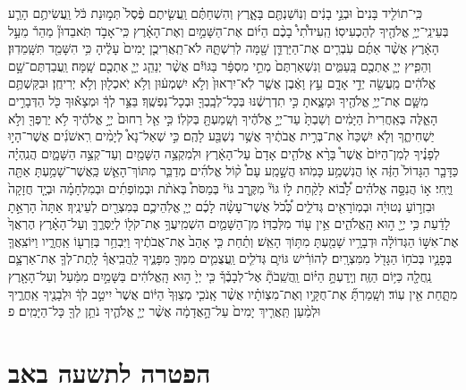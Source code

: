 \documentclass[twoside, openany, parskip=half, 11pt]{book}
\begin{document}
\begin{footnotesize}
\begin{multicols}{2}
כִּֽי־תוֹלִ֤יד בָּנִים֙ וּבְנֵ֣י בָנִ֔ים וְנֽוֹשַׁנְתֶּ֖ם בָּאָ֑רֶץ וְהִשְׁחַתֶּ֗ם וַֽעֲשִׂ֤יתֶם פֶּ֨סֶל֙ תְּמ֣וּנַת כֹּ֔ל וַֽעֲשִׂיתֶ֥ם הָרַ֛ע בְּעֵינֵֽי־יְיָ֥ אֱלֹהֶ֖יךָ לְהַכְעִיסֽוֹ׃ הַֽעִידֹ֩תִי֩ בָכֶ֨ם הַיּ֜וֹם אֶת־הַשָּׁמַ֣יִם וְאֶת־הָאָ֗רֶץ כִּֽי־אָבֹ֣ד תֹּֽאבֵדוּן֘ מַהֵר֒ מֵעַ֣ל הָאָ֔רֶץ אֲשֶׁ֨ר אַתֶּ֜ם עֹֽבְרִ֧ים אֶת־הַיַּרְדֵּ֛ן שָׁ֖מָּה לְרִשְׁתָּ֑הּ לֹא־תַֽאֲרִיכֻ֤ן יָמִים֙ עָלֶ֔יהָ כִּ֥י הִשָּׁמֵ֖ד תִּשָּֽׁמֵדֽוּן׃ וְהֵפִ֧יץ יְיָ֛ אֶתְכֶ֖ם בָּֽעַמִּ֑ים וְנִשְׁאַרְתֶּם֙ מְתֵ֣י מִסְפָּ֔ר בַּגּוֹיִ֕ם אֲשֶׁ֨ר יְנַהֵ֧ג יְיָ֛ אֶתְכֶ֖ם שָֽׁמָּה׃ וַֽעֲבַדְתֶּם־שָׁ֣ם אֱלֹהִ֔ים מַֽעֲשֵׂ֖ה יְדֵ֣י אָדָ֑ם עֵ֣ץ וָאֶ֔בֶן אֲשֶׁ֤ר לֹֽא־יִרְאוּן֙ וְלֹ֣א יִשְׁמְע֔וּן וְלֹ֥א יֹֽאכְל֖וּן וְלֹ֥א יְרִיחֻֽן׃ וּבִקַּשְׁתֶּ֥ם מִשָּׁ֛ם אֶת־יְיָ֥ אֱלֹהֶ֖יךָ וּמָצָ֑אתָ כִּ֣י תִדְרְשֶׁ֔נּוּ בְּכָל־לְבָֽבְךָ֖ וּבְכָל־נַפְשֶֽׁךָ׃ 
בַּצַּ֣ר לְךָ֔ וּמְצָא֕וּךָ כֹּ֖ל הַדְּבָרִ֣ים הָאֵ֑לֶּה בְּאַֽחֲרִית֙ הַיָּמִ֔ים וְשַׁבְתָּ֙ עַד־יְיָ֣ אֱלֹהֶ֔יךָ וְשָֽׁמַעְתָּ֖ בְּקֹלֽוֹ׃ כִּ֣י אֵ֤ל רַחוּם֙ יְיָ֣ אֱלֹהֶ֔יךָ לֹ֥א יַרְפְּךָ֖ וְלֹ֣א יַשְׁחִיתֶ֑ךָ וְלֹ֤א יִשְׁכַּח֙ אֶת־בְּרִ֣ית אֲבֹתֶ֔יךָ אֲשֶׁ֥ר נִשְׁבַּ֖ע לָהֶֽם׃ כִּ֣י שְׁאַל־נָא֩ לְיָמִ֨ים רִֽאשֹׁנִ֜ים אֲשֶׁר־הָי֣וּ לְפָנֶ֗יךָ לְמִן־הַיּוֹם֙ אֲשֶׁר֩ בָּרָ֨א אֱלֹהִ֤ים אָדָם֙ עַל־הָאָ֔רֶץ וּלְמִקְצֵ֥ה הַשָּׁמַ֖יִם וְעַד־קְצֵ֣ה הַשָּׁמָ֑יִם הֲנִֽהְיָ֗ה כַּדָּבָ֤ר הַגָּדוֹל֙ הַזֶּ֔ה א֖וֹ הֲנִשְׁמַ֥ע כָּמֹֽהוּ׃ הֲשָׁ֣מַֽע עָם֩ ק֨וֹל אֱלֹהִ֜ים מְדַבֵּ֧ר מִתּוֹךְ־הָאֵ֛שׁ כַּֽאֲשֶׁר־שָׁמַ֥עְתָּ אַתָּ֖ה וַיֶּֽחִי׃ א֣וֹ הֲנִסָּ֣ה אֱלֹהִ֗ים לָ֠ב֠וֹא לָקַ֨חַת ל֣וֹ גּוֹי֘ מִקֶּ֣רֶב גּוֹי֒ בְּמַסֹּת֩ בְּאֹתֹ֨ת וּבְמֽוֹפְתִ֜ים וּבְמִלְחָמָ֗ה וּבְיָ֤ד חֲזָקָה֙ וּבִזְר֣וֹעַ נְטוּיָ֔ה וּבְמֽוֹרָאִ֖ים גְּדֹלִ֑ים כְּ֠כֹ֠ל אֲשֶׁר־עָשָׂ֨ה לָכֶ֜ם יְיָ֧ אֱלֹֽהֵיכֶ֛ם בְּמִצְרַ֖יִם לְעֵינֶֽיךָ׃ אַתָּה֙ הָרְאֵ֣תָ לָדַ֔עַת כִּ֥י יְיָ֖ ה֣וּא הָֽאֱלֹהִ֑ים אֵ֥ין ע֖וֹד מִלְּבַדּֽוֹ׃
 מִן־הַשָּׁמַ֛יִם הִשְׁמִֽיעֲךָ֥ אֶת־קֹל֖וֹ לְיַסְּרֶ֑ךָּ וְעַל־הָאָ֗רֶץ הֶרְאֲךָ֙ אֶת־אִשּׁ֣וֹ הַגְּדוֹלָ֔ה וּדְבָרָ֥יו שָׁמַ֖עְתָּ מִתּ֥וֹךְ הָאֵֽשׁ׃ וְתַ֗חַת כִּ֤י אָהַב֙ אֶת־אֲבֹתֶ֔יךָ וַיִּבְחַ֥ר בְּזַרְע֖וֹ אַֽחֲרָ֑יו וַיּוֹצִֽאֲךָ֧ בְּפָנָ֛יו בְּכֹח֥וֹ הַגָּדֹ֖ל מִמִּצְרָֽיִם׃ לְהוֹרִ֗ישׁ גּוֹיִ֛ם גְּדֹלִ֧ים וַֽעֲצֻמִ֛ים מִמְּךָ֖ מִפָּנֶ֑יךָ לַֽהֲבִֽיאֲךָ֗ לָֽתֶת־לְךָ֧ אֶת־אַרְצָ֛ם נַֽחֲלָ֖ה כַּיּ֥וֹם הַזֶּֽה׃ וְיָֽדַעְתָּ֣ הַיּ֗וֹם וַֽהֲשֵֽׁבֹתָ֘ אֶל־לְבָבֶ֒ךָ֒ כִּ֤י יְיָ֙ ה֣וּא הָֽאֱלֹהִ֔ים בַּשָּׁמַ֣יִם מִמַּ֔עַל וְעַל־הָאָ֖רֶץ מִתָּ֑חַת אֵ֖ין עֽוֹד׃ וְשָֽׁמַרְתָּ֞ אֶת־חֻקָּ֣יו וְאֶת־מִצְוֹתָ֗יו אֲשֶׁ֨ר אָֽנֹכִ֤י מְצַוְּךָ֙ הַיּ֔וֹם אֲשֶׁר֙ יִיטַ֣ב לְךָ֔ וּלְבָנֶ֖יךָ אַֽחֲרֶ֑יךָ וּלְמַ֨עַן תַּֽאֲרִ֤יךְ יָמִים֙ עַל־הָ֣אֲדָמָ֔ה אֲשֶׁ֨ר יְיָ֤ אֱלֹהֶ֛יךָ נֹתֵ֥ן לְךָ֖ כָּל־הַיָּמִֽים׃ פ

\end{multicols}

\section*{הפטרה לתשעה באב}


\end{footnotesize}
\end{document}
